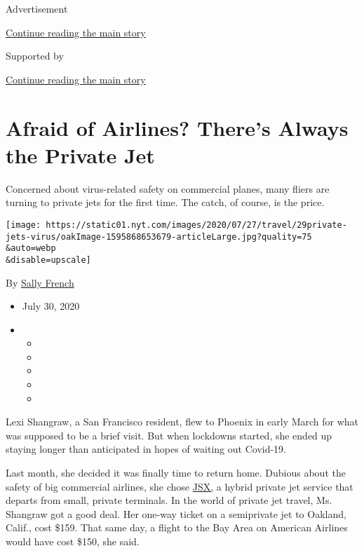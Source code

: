 Advertisement

\protect\hyperlink{after-top}{Continue reading the main story}

Supported by

\protect\hyperlink{after-sponsor}{Continue reading the main story}

\hypertarget{afraid-of-airlines-theres-always-the-private-jet}{%
\section{Afraid of Airlines? There's Always the Private
Jet}\label{afraid-of-airlines-theres-always-the-private-jet}}

Concerned about virus-related safety on commercial planes, many fliers
are turning to private jets for the first time. The catch, of course, is
the price.

\texttt{[image: https://static01.nyt.com/images/2020/07/27/travel/29private-jets-virus/oakImage-1595868653679-articleLarge.jpg?quality=75\\\&auto=webp\\\&disable=upscale]}

By \href{https://www.nytimes.com/by/sally-french}{Sally French}

\begin{itemize}
\item
  July 30, 2020
\item
  \begin{itemize}
  \item
  \item
  \item
  \item
  \item
  \end{itemize}
\end{itemize}

Lexi Shangraw, a San Francisco resident, flew to Phoenix in early March
for what was supposed to be a brief visit. But when lockdowns started,
she ended up staying longer than anticipated in hopes of waiting out
Covid-19.

Last month, she decided it was finally time to return home. Dubious
about the safety of big commercial airlines, she chose
\href{https://www.jsx.com/home/search}{JSX,} a hybrid private jet
service that departs from small, private terminals. In the world of
private jet travel, Ms. Shangraw got a good deal. Her one-way ticket on
a semiprivate jet to Oakland, Calif., cost \$159. That same day, a
flight to the Bay Area on American Airlines would have cost \$150, she
said.


